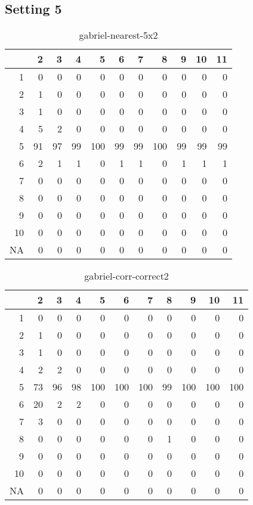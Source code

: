 \documentclass[11pt]{article}
\begin{document}
\subsection{Setting 5}
\begin{table}[H]
\centering
\begin{tabular}{rrrrrrrrrrr}
  \hline
 & 2 & 3 & 4 & 5 & 6 & 7 & 8 & 9 & 10 & 11 \\ 
  \hline
1 & 0 & 0 & 0 & 0 & 0 & 0 & 0 & 0 & 0 & 0 \\ 
  2 & 1 & 0 & 0 & 0 & 0 & 0 & 0 & 0 & 0 & 0 \\ 
  3 & 1 & 0 & 0 & 0 & 0 & 0 & 0 & 0 & 0 & 0 \\ 
  4 & 5 & 2 & 0 & 0 & 0 & 0 & 0 & 0 & 0 & 0 \\ 
  5 & 91 & 97 & 99 & 100 & 99 & 99 & 100 & 99 & 99 & 99 \\ 
  6 & 2 & 1 & 1 & 0 & 1 & 1 & 0 & 1 & 1 & 1 \\ 
  7 & 0 & 0 & 0 & 0 & 0 & 0 & 0 & 0 & 0 & 0 \\ 
  8 & 0 & 0 & 0 & 0 & 0 & 0 & 0 & 0 & 0 & 0 \\ 
  9 & 0 & 0 & 0 & 0 & 0 & 0 & 0 & 0 & 0 & 0 \\ 
  10 & 0 & 0 & 0 & 0 & 0 & 0 & 0 & 0 & 0 & 0 \\ 
  NA & 0 & 0 & 0 & 0 & 0 & 0 & 0 & 0 & 0 & 0 \\ 
   \hline
\end{tabular}
\caption{gabriel-nearest-5x2} 
\end{table}
\begin{table}[H]
\centering
\begin{tabular}{rrrrrrrrrrr}
  \hline
 & 2 & 3 & 4 & 5 & 6 & 7 & 8 & 9 & 10 & 11 \\ 
  \hline
1 & 0 & 0 & 0 & 0 & 0 & 0 & 0 & 0 & 0 & 0 \\ 
  2 & 1 & 0 & 0 & 0 & 0 & 0 & 0 & 0 & 0 & 0 \\ 
  3 & 1 & 0 & 0 & 0 & 0 & 0 & 0 & 0 & 0 & 0 \\ 
  4 & 2 & 2 & 0 & 0 & 0 & 0 & 0 & 0 & 0 & 0 \\ 
  5 & 73 & 96 & 98 & 100 & 100 & 100 & 99 & 100 & 100 & 100 \\ 
  6 & 20 & 2 & 2 & 0 & 0 & 0 & 0 & 0 & 0 & 0 \\ 
  7 & 3 & 0 & 0 & 0 & 0 & 0 & 0 & 0 & 0 & 0 \\ 
  8 & 0 & 0 & 0 & 0 & 0 & 0 & 1 & 0 & 0 & 0 \\ 
  9 & 0 & 0 & 0 & 0 & 0 & 0 & 0 & 0 & 0 & 0 \\ 
  10 & 0 & 0 & 0 & 0 & 0 & 0 & 0 & 0 & 0 & 0 \\ 
  NA & 0 & 0 & 0 & 0 & 0 & 0 & 0 & 0 & 0 & 0 \\ 
   \hline
\end{tabular}
\caption{gabriel-corr-correct2} 
\end{table}
\end{document}

